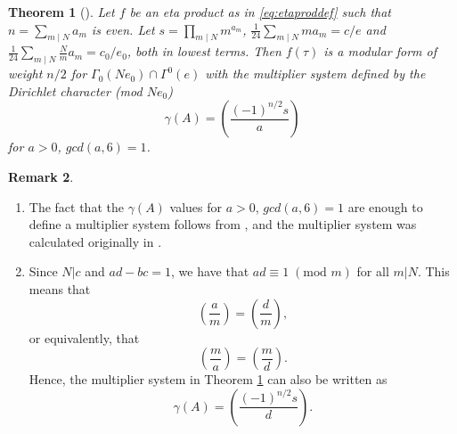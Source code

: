 \documentclass[11pt,a4paper]{amsart}
\newtheorem{theorem}{Theorem}[section]
\theoremstyle{definition}
\newtheorem{remark}[theorem]{Remark}
\begin{document}
\begin{theorem}[{\cite[Theorem 3]{gordon1993multiplicative}}] 
\label{thm:etaprodmodeven}	
	Let $f$ be an eta product as in \eqref{eq:etaproddef} such that $n=\sum_{m \mid N} a_m$ is even. Let $s=\prod_{m \mid N} m^{a_m}$,  $\frac{1}{24}\sum_{m \mid N} ma_m=c/e$ and $\frac{1}{24}\sum_{m \mid N} \frac{N}{m}a_m=c_0/e_0$, both in lowest terms. Then $f(\tau)$ is a modular form of weight $n/2$ for $\Gamma_0(Ne_0)\cap\Gamma^0(e)$ with the multiplier system defined by the Dirichlet character (mod $Ne_0$)
	\[ \gamma(A)=\left( \frac{(-1)^{n/2} s}{a} \right) \]
	for $a>0$, $gcd(a,6)=1$.
\end{theorem}
\begin{remark}
	\label{rem:multsyst}
\begin{enumerate}
\item The fact that the $\gamma(A)$ values for $a>0$, $gcd(a,6)=1$ are enough to define a multiplier system follows from \cite[Lemma 3]{newman1959construction}, and the multiplier system was calculated originally in \cite[Theorem 1]{newman1959construction}.
\item\label{it:multsyst2} Since $N|c$ and $ad-bc=1$, we have that $ad \equiv 1  \;(\textrm{mod }m)$ for all $m|N$. This means that
\[ \left(\frac{a}{m}\right)=\left(\frac{d}{m}\right),\]
or equivalently, that 
\[ \left(\frac{m}{a}\right)=\left(\frac{m}{d}\right).\]
Hence, the multiplier system in Theorem \ref{thm:etaprodmodeven} can also be written as 
\[ \gamma(A)=\left( \frac{(-1)^{n/2} s}{d} \right). \]
\end{enumerate}
\end{remark}

\end{document}
